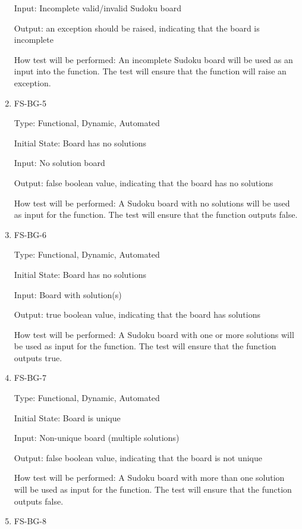 \documentclass[11pt]{article}
\begin{document}
\begin{enumerate}
Input: Incomplete valid/invalid Sudoku board
					
Output: an exception should be raised, indicating that the board is incomplete
					
How test will be performed: An incomplete Sudoku board will be used as an input into the function. The test will ensure that the function will raise an exception.

\item{FS-BG-5\\}

Type: Functional, Dynamic, Automated
					
Initial State: Board has no solutions
					
Input: No solution board
					
Output: false boolean value, indicating that the board has no solutions
					
How test will be performed: A Sudoku board with no solutions will be used as input for the function. The test will ensure that the function outputs false.

\item{FS-BG-6\\}

Type: Functional, Dynamic, Automated
					
Initial State: Board has no solutions
					
Input: Board with solution(s)
					
Output: true boolean value, indicating that the board has solutions
					
How test will be performed: A Sudoku board with one or more solutions will be used as input for the function. The test will ensure that the function outputs true.

\item{FS-BG-7\\}

Type: Functional, Dynamic, Automated
					
Initial State: Board is unique
					
Input: Non-unique board (multiple solutions)
					
Output: false boolean value, indicating that the board is not unique
					
How test will be performed: A Sudoku board with more than one solution will be used as input for the function. The test will ensure that the function outputs false.

\item{FS-BG-8\\}


\end{enumerate}
\end{document}
